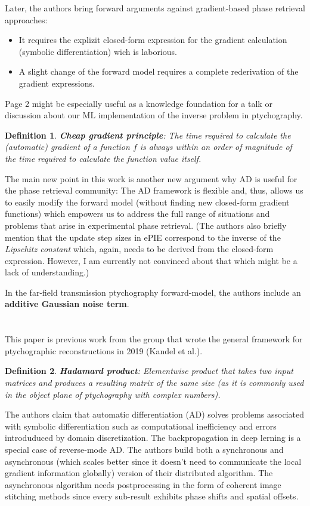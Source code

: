 \documentclass{article}
\newcommand{\newcite}[1] {\section{\cite{#1} \citenum{#1}}}
\begin{document}
Later, the authors bring forward arguments against gradient-based phase retrieval approaches:
\begin{itemize}
    \item It requires the explizit closed-form expression for the gradient calculation (symbolic differentiation) wich is laborious.
    \item A slight change of the forward model requires a complete rederivation of the gradient expressions.
\end{itemize}

Page 2 might be especially useful as a knowledge foundation for a talk or discussion about our ML implementation of the inverse problem in ptychography.

\newtheorem{mydef}{Definition}
\begin{mydef}
\textbf{Cheap gradient principle}: The time required to calculate the (automatic) gradient of a function $f$ is always within an order of magnitude of the time required to calculate the function value itself.
\end{mydef}
The main new point in this work is another new argument why AD is useful for the phase retrieval community: The AD framework is flexible and, thus, allows us to easily modify the forward model (without finding new closed-form gradient functions) which empowers us to address the full range of situations and problems that arise in experimental phase retrieval. (The authors also briefly mention that the update step sizes in ePIE correspond to the inverse of the \textit{Lipschitz constant} which, again, needs to be derived from the closed-form expression. However, I am currently not convinced about that which might be a lack of understanding.)

In the far-field transmission ptychography forward-model, the authors include an \textbf{additive Gaussian noise term}. 


\newcite{Nashed2017-pd}
This paper is previous work from the group that wrote the general framework for ptychographic reconstructions in 2019 (Kandel et al.). 
\begin{mydef}
\textbf{Hadamard product}: Elementwise product that takes two input matrices and produces a resulting matrix of the same size (as it is commonly used in the object plane of ptychography with complex numbers).
\end{mydef}
The authors claim that automatic differentiation (AD) solves problems associated with symbolic differentiation such as computational inefficiency and errors introduduced by domain discretization. The backpropagation in deep lerning is a special case of reverse-mode AD. The authors build both a synchronous and asynchronous (which scales better since it doesn't need to communicate the local gradient information globally) version of their distributed algorithm. The asynchronous algorithm needs postprocessing in the form of coherent image stitching methods since every sub-result exhibits phase shifts and spatial offsets.
\end{document}
